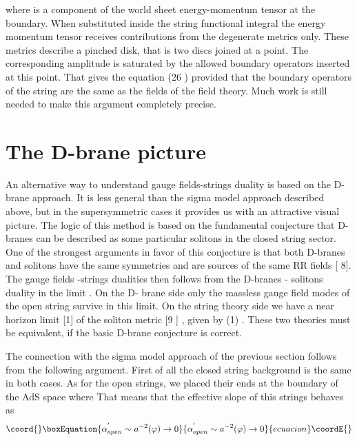\documentclass[a4paper,12pt]{article}
\begin{document}
where \coordHE{} is a component of the world sheet energy-momentum
tensor at the boundary. When substituted inside the string functional
integral the energy momentum tensor receives contributions from the
degenerate metrics only. These metrics describe a pinched disk, that is two
discs joined at a point. The corresponding amplitude is saturated by the
allowed boundary operators inserted at this point. That gives the equation
(26 ) provided that the boundary operators of the string are the same as the
fields of the field theory. Much work is still needed to make this argument
completely precise.

\section{The D-brane picture}

An alternative way to understand gauge fields-strings duality is based on
the D-brane approach. It is less general than the sigma model approach
described above, but in the supersymmetric cases it provides us with an
attractive visual picture. The logic of this method is based on the
fundamental conjecture that D-branes can be described as some particular
solitons in the closed string sector. One of the strongest arguments in
favor of this conjecture is that both D-branes and solitons have the same
symmetries and are sources of the same RR fields [ 8]. The gauge fields
-strings dualities then follows from the D-branes - solitons duality in the
limit \coordHE{}. On the D- brane side only the
massless gauge field modes of the open string survive in this limit. On the
string theory side we have a near horizon limit [1] of the soliton metric [9
] , given by (1) . These two theories must be equivalent, if the basic
D-brane conjecture is correct.

The connection with the sigma model approach of the previous section follows
from the following argument. First of all the closed string background is
the same in both cases. As for the open strings, we placed their ends at the
boundary of the AdS space where \coordHE{} That means that the effective slope of this strings behaves as 
\begin{equation}\coord{}\boxEquation{
\alpha _{open}^{^{\prime }}\sim a^{-2}(\varphi )\rightarrow 0
}{
\alpha _{open}^{^{\prime }}\sim a^{-2}(\varphi )\rightarrow 0
}{ecuacion}\coordE{}\end{equation}
\end{document}
